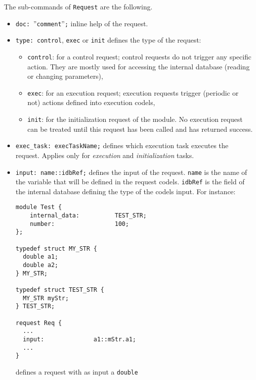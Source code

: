 \noindent
The sub-commands of \texttt{Request} are the following.\\

\begin{itemize}
\item[]\texttt{doc: }''\texttt{comment}''{\tt;} inline help of the request.
\item[]\texttt{type:  control}, \texttt{exec} or \texttt{init} defines the type of the request:
  \begin{itemize}
  \item \texttt{control}: for a control request; control requests do not
    trigger any specific action. They are mostly used for accessing the
    internal database (reading or changing parameters),
  \item \texttt{exec}: for an execution request; execution requests trigger
    (periodic or not) actions defined into execution codels,
  \item \texttt{init}: for the initialization request of the module. No
    execution request can be treated until this request has been
    called and has returned success.
  \end{itemize}

\item[]\texttt{exec\_task:  execTaskName;} defines which execution task
executes the request. Applies only for \emph{execution} and
\emph{initialization} tasks.

\item[]\texttt{input: name::idbRef;} defines the input of the
  request. \texttt{name} is the name of the variable that will be
  defined in the request codels. \texttt{idbRef} is the field of the
  internal database defining the type of the codels input. For instance:\\
\begin{verbatim}
module Test {
    internal_data:          TEST_STR;
    number:                 100;
};

typedef struct MY_STR {
  double a1;
  double a2;
} MY_STR;

typedef struct TEST_STR {
  MY_STR myStr;
} TEST_STR;

request Req {
  ...
  input:              a1::mStr.a1;
  ...
}
\end{verbatim}
defines a request with as input a \texttt{double}\\


\end{itemize}
